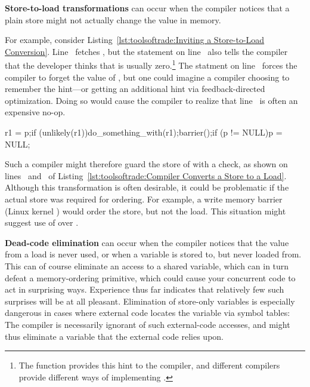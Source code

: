 {\bf Store-to-load transformations} can occur when the compiler notices
that a plain store might not actually change the value in memory.
\begin{fcvref}
For example, consider
Listing~\ref{lst:toolsoftrade:Inviting a Store-to-Load Conversion}.
Line~ fetches , but the  statement on
line~ also tells the compiler that the developer thinks that
 is usually zero.\footnote{
	The  function provides this hint to the compiler,
	and different compilers provide different ways of implementing
	.}
The  statment on line~ forces the compiler
to forget the value of , but one could imagine a compiler
choosing to remember the hint---or getting an additional hint via
feedback-directed optimization.
Doing so would cause the compiler to realize that line~
is often an expensive no-op.
\end{fcvref}

\begin{listing}[tbp]
\begin{fcvlabel}
\begin{VerbatimL}[commandchars=\\\[\]]
r1 = p;\lnlbl[load:p]
if (unlikely(r1))\lnlbl[if]
	do_something_with(r1);\lnlbl[dsw]
barrier();\lnlbl[barrier]
if (p != NULL)\lnlbl[if1]
	p = NULL;\lnlbl[null]
\end{VerbatimL}
\end{fcvlabel}
\caption{Compiler Converts a Store to a Load}
\label{lst:toolsoftrade:Compiler Converts a Store to a Load}
\end{listing}

\begin{fcvref}
Such a compiler might therefore guard the store of 
with a check, as shown on lines~ and~ of
Listing~\ref{lst:toolsoftrade:Compiler Converts a Store to a Load}.
Although this transformation is often desirable, it could be problematic
if the actual store was required for ordering.
For example, a write memory barrier (Linux kernel ) would
order the store, but not the load.
This situation might suggest use of  over
.
\end{fcvref}

{\bf Dead-code elimination} can occur when the compiler notices that
the value from a load is never used, or when a variable is stored to,
but never loaded from.
This can of course eliminate an access to a shared variable, which
can in turn defeat a memory-ordering primitive, which could cause your
concurrent code to act in surprising ways.
Experience thus far indicates that relatively few such surprises will
be at all pleasant.
Elimination of store-only variables is especially dangerous in cases
where external code locates the variable via symbol tables: The
compiler is necessarily ignorant of such external-code accesses, and
might thus eliminate a variable that the external code relies upon.

